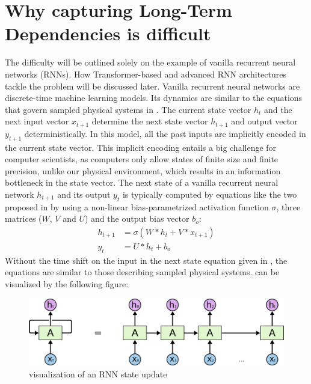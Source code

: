 \documentclass[draft,final]{vutinfth} %
\begin{document}
    \section{Why capturing Long-Term Dependencies is difficult} \label{long_term_difficult}
    The difficulty will be outlined solely on the example of vanilla recurrent neural networks (RNNs).
    How Transformer-based and advanced RNN architectures tackle the problem will be discussed later.
    Vanilla recurrent neural networks are discrete-time machine learning models.
    Its dynamics are similar to the equations that govern sampled physical systems in .
    The current state vector $h_{t}$ and the next input vector $x_{t+1}$ determine the next state vector $h_{t+1}$ and output vector $y_{t+1}$ deterministically.
    In this model, all the past inputs are implicitly encoded in the current state vector.
    This implicit encoding entails a big challenge for computer scientists, as computers only allow states of finite size and finite precision, unlike our physical environment, which results in an information bottleneck in the state vector.
    The next state of a vanilla recurrent neural network $h_{t+1}$ and its output $y_{t}$ is typically computed by equations like the two proposed in \cite[p. 2]{UnitaryRNNs} by using a non-linear bias-parametrized activation function $\sigma$, three matrices ($W$, $V$ and $U$) and the output bias vector $b_o$:
    \begin{align}
        \label{rnn_state_update}
        h_{t+1} &= \sigma(W*h_t + V*x_{t+1}) \\
        \label{rnn_output}
        y_{t} &= U*h_{t} + b_o
    \end{align}
    Without the time shift on the input in the next state equation given in , the equations are similar to those describing sampled physical systems.
     can be visualized by the following figure:
    \begin{figure}[H]
        \centering{}
        \includegraphics[width=0.8\linewidth]{graphics/rnn.png}
        \caption{visualization of an RNN state update \cite{rnn_vis}}
        \label{fig:rnn_vis}
    \end{figure}
\end{document}
